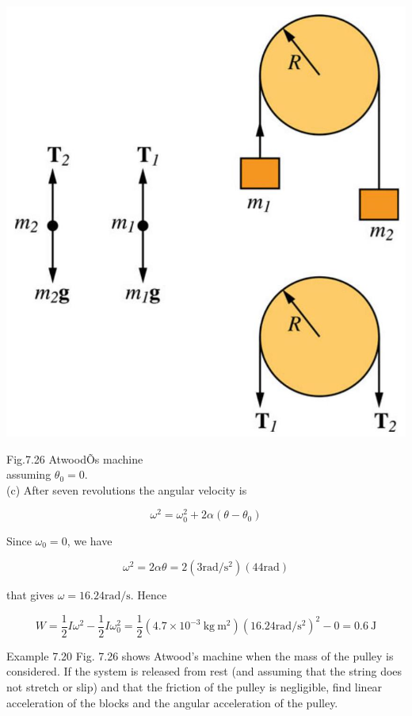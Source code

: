 \documentclass[10pt]{article}
\begin{document}
\begin{center}
\includegraphics[max width=\textwidth]{2024_09_13_db1f357d2aad0a03eb2eg-126}
\end{center}

Fig.7.26 AtwoodÕs machine\\
assuming $\theta_{0}=0$.\\
(c) After seven revolutions the angular velocity is

$$
\omega^{2}=\omega_{0}^{2}+2 \alpha\left(\theta-\theta_{0}\right)
$$

Since $\omega_{0}=0$, we have

$$
\omega^{2}=2 \alpha \theta=2\left(3 \mathrm{rad} / \mathrm{s}^{2}\right)(44 \mathrm{rad})
$$

that gives $\omega=16.24 \mathrm{rad} / \mathrm{s}$. Hence

$$
W=\frac{1}{2} I \omega^{2}-\frac{1}{2} I \omega_{0}^{2}=\frac{1}{2}\left(4.7 \times 10^{-3} \mathrm{~kg} \mathrm{~m}^{2}\right)\left(16.24 \mathrm{rad} / \mathrm{s}^{2}\right)^{2}-0=0.6 \mathrm{~J}
$$

Example 7.20 Fig. 7.26 shows Atwood's machine when the mass of the pulley is considered. If the system is released from rest (and assuming that the string does not stretch or slip) and that the friction of the pulley is negligible, find linear acceleration of the blocks and the angular acceleration of the pulley.
\end{document}
